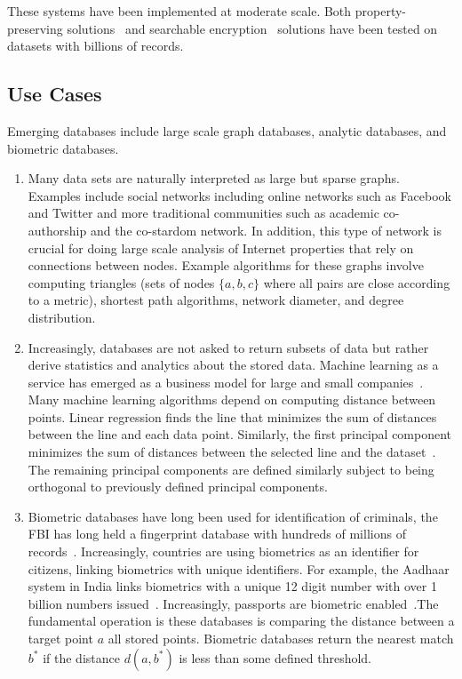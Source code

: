 These systems have been implemented at moderate scale.  Both property-preserving solutions~\cite{EPRINT:PodBoePop16,CACM:PRZB12} and searchable encryption~\cite{SP:PKVKMC14,SP:FVKKKM15,C:CJJKRS13,CCS:JJKRS13,NDSS:CJJJKR14,ESORICS:FJKNRS15,RSA:IKLO16} solutions have been tested on datasets with billions of records.

%


\subsection{Use Cases}
Emerging databases include large scale graph databases, analytic databases, and
biometric databases. 
\begin{enumerate}
\item Many data sets are naturally interpreted as large but sparse graphs.  Examples include social networks including online networks such as Facebook and Twitter and more traditional communities such as academic co-authorship and the co-stardom network.  In addition, this type of network is crucial for doing large scale analysis of Internet properties that rely on connections between nodes.  Example algorithms for these graphs involve computing triangles (sets of nodes $\{a,b,c\}$ where all pairs are close according to a metric), shortest path algorithms, network diameter, and degree distribution.
\item  Increasingly, databases are not asked to return subsets of data but rather derive statistics and analytics about the stored data.  Machine learning as a service has emerged as a business model for large and small companies~\cite{mlservice}.  Many machine learning algorithms depend on computing distance between points. Linear regression finds the line that minimizes the sum of distances between the line and each data point.  Similarly, the first principal component minimizes the sum of distances between the selected line and the dataset~\cite{wold1987principal}.  The remaining principal components are defined similarly subject to being orthogonal to previously defined principal components.
\item Biometric databases have long been used for identification of criminals, the FBI has long held a fingerprint database with hundreds of millions of records~\cite{brislawn1996fbi}.  Increasingly, countries are using biometrics as an identifier for citizens, linking biometrics with unique identifiers.  For example, the Aadhaar system in India links biometrics with a unique 12 digit number with over 1 billion numbers issued~\cite{daugman2014600}.  Increasingly, passports are biometric enabled~\cite{stanton2008icao}.The fundamental operation is these databases is comparing the distance between a target point $a$ all stored points. Biometric databases return the nearest match $b^*$ if the distance $d(a,b^*)$ is less than some defined threshold.  
\end{enumerate}

